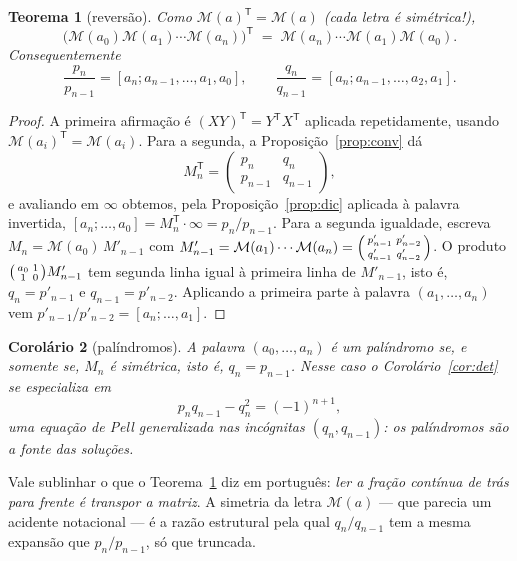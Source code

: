 \documentclass[11pt,a4paper]{article}
\theoremstyle{plain}
\newtheorem{teorema}{Teorema}[section]
\newtheorem{corolario}[teorema]{Corolário}
\theoremstyle{definition}
\theoremstyle{remark}
\newcommand{\Mat}[1]{\mathcal{M}(#1)}
\newcommand{\cf}[2]{[#1;#2]}
\begin{document}
\begin{teorema}[reversão]\label{thm:rev}
Como $\Mat{a}^{\mathsf T} = \Mat{a}$ (cada letra é simétrica!),
\[
  \big(\Mat{a_0}\Mat{a_1}\cdots\Mat{a_n}\big)^{\mathsf T}
  \;=\; \Mat{a_n}\cdots\Mat{a_1}\Mat{a_0}.
\]
Consequentemente
\[
  \frac{p_n}{p_{n-1}} = \cf{a_n}{a_{n-1},\dots,a_1,a_0},
  \qquad
  \frac{q_n}{q_{n-1}} = \cf{a_n}{a_{n-1},\dots,a_2,a_1}.
\]
\end{teorema}

\begin{proof}
A primeira afirmação é $(XY)^{\mathsf T} = Y^{\mathsf T}X^{\mathsf T}$ aplicada repetidamente,
usando $\Mat{a_i}^{\mathsf T}=\Mat{a_i}$. Para a segunda, a Proposição~\ref{prop:conv} dá
\[
  M_n^{\mathsf T} = \begin{pmatrix} p_n & q_n \\ p_{n-1} & q_{n-1}\end{pmatrix},
\]
e avaliando em $\infty$ obtemos, pela Proposição~\ref{prop:dic} aplicada à palavra invertida,
$\cf{a_n}{\dots,a_0} = M_n^{\mathsf T}\cdot\infty = p_n/p_{n-1}$.
Para a segunda igualdade, escreva $M_n = \Mat{a_0}\,M'_{n-1}$ com
$M'_{n-1}=\Mat{a_1}\cdots\Mat{a_n} = \begin{psmallmatrix}p'_{n-1}&p'_{n-2}\\ q'_{n-1}&q'_{n-2}\end{psmallmatrix}$.
O produto $\begin{psmallmatrix}a_0&1\\1&0\end{psmallmatrix}M'_{n-1}$ tem segunda linha igual à
primeira linha de $M'_{n-1}$, isto é, $q_n = p'_{n-1}$ e $q_{n-1}=p'_{n-2}$. Aplicando a
primeira parte à palavra $(a_1,\dots,a_n)$ vem $p'_{n-1}/p'_{n-2} = \cf{a_n}{\dots,a_1}$.
\end{proof}

\begin{corolario}[palíndromos]
A palavra $(a_0,\dots,a_n)$ é um palíndromo se, e somente se, $M_n$ é simétrica, isto é,
$q_n = p_{n-1}$. Nesse caso o Corolário~\ref{cor:det} se especializa em
\[
  p_nq_{n-1} - q_n^2 = (-1)^{n+1},
\]
uma equação de Pell generalizada nas incógnitas $(q_n,q_{n-1})$: os palíndromos são a fonte
das soluções.
\end{corolario}

Vale sublinhar o que o Teorema~\ref{thm:rev} diz em português: \emph{ler a fração contínua de
trás para frente é transpor a matriz}. A simetria da letra $\Mat{a}$ --- que parecia um acidente
notacional --- é a razão estrutural pela qual $q_n/q_{n-1}$ tem a mesma expansão que
$p_n/p_{n-1}$, só que truncada.
\end{document}
